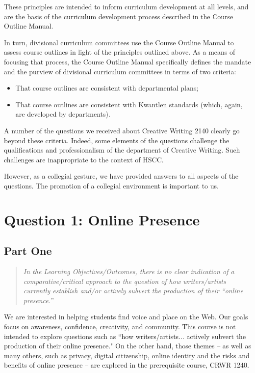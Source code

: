 \documentclass[letterpaper,10pt,headsepline]{scrreprt}
\begin{document}
These principles are intended to inform curriculum development at all levels, and are the basis of the curriculum development process described in the Course Outline Manual.

In turn, divisional curriculum committees use the Course Outline Manual to assess course outlines in light of the principles outlined above. As a means of focusing that process, the Course Outline Manual specifically defines the mandate and the purview of divisional curriculum committees in terms of two criteria:

\begin{itemize}
\item That course outlines are consistent with departmental plans;
\item That course outlines are consistent with Kwantlen standards (which, again, are developed by departments).
\end{itemize}

A number of the questions we received about Creative Writing 2140 clearly go beyond these criteria. Indeed, some elements of the questions challenge the qualifications and professionalism of the department of Creative Writing. Such challenges are inappropriate to the context of HSCC.

However, as a collegial gesture, we have provided answers to all aspects of the questions. The promotion of a collegial environment is important to us.

\section{Question 1: Online Presence}

\subsection{Part One}

\begin{quote}
\textit{In the Learning Objectives/Outcomes, there is no clear indication of a comparative/critical approach to the question of how writers/artists currently establish and/or actively subvert the production of their ``online presence.''}
\end{quote}

We are interested in helping students find voice and place on the Web. Our goals focus on awareness, confidence, creativity, and community. This course is not intended to explore questions such as ``how writers/artists... actively subvert the production of their online presence." On the other hand, those themes -- as well as many others, such as privacy, digital citizenship, online identity and the risks and benefits of online presence -- are explored in the prerequisite course, CRWR 1240. 
\end{document}
